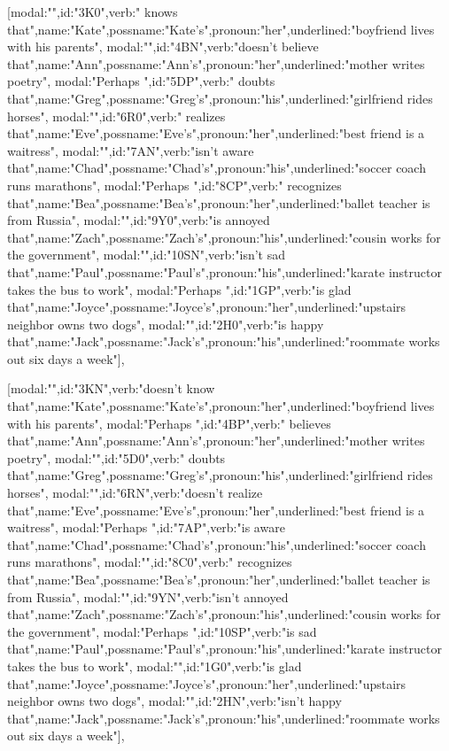 [{modal:"",id:"3K0",verb:" knows that",name:"Kate",possname:"Kate's",pronoun:"her",underlined:"boyfriend lives with his parents"},
{modal:"",id:"4BN",verb:"doesn't believe that",name:"Ann",possname:"Ann's",pronoun:"her",underlined:"mother writes poetry"},
{modal:"Perhaps ",id:"5DP",verb:" doubts that",name:"Greg",possname:"Greg's",pronoun:"his",underlined:"girlfriend rides horses"},
{modal:"",id:"6R0",verb:" realizes that",name:"Eve",possname:"Eve's",pronoun:"her",underlined:"best friend is a waitress"},
{modal:"",id:"7AN",verb:"isn't aware that",name:"Chad",possname:"Chad's",pronoun:"his",underlined:"soccer coach runs marathons"},
{modal:"Perhaps ",id:"8CP",verb:" recognizes that",name:"Bea",possname:"Bea's",pronoun:"her",underlined:"ballet teacher is from Russia"},
{modal:"",id:"9Y0",verb:"is annoyed that",name:"Zach",possname:"Zach's",pronoun:"his",underlined:"cousin works for the government"},
{modal:"",id:"10SN",verb:"isn't sad that",name:"Paul",possname:"Paul's",pronoun:"his",underlined:"karate instructor takes the bus to work"},
{modal:"Perhaps ",id:"1GP",verb:"is glad that",name:"Joyce",possname:"Joyce's",pronoun:"her",underlined:"upstairs neighbor owns two dogs"},
{modal:"",id:"2H0",verb:"is happy that",name:"Jack",possname:"Jack's",pronoun:"his",underlined:"roommate works out six days a week"}],

[{modal:"",id:"3KN",verb:"doesn't know that",name:"Kate",possname:"Kate's",pronoun:"her",underlined:"boyfriend lives with his parents"},
{modal:"Perhaps ",id:"4BP",verb:" believes that",name:"Ann",possname:"Ann's",pronoun:"her",underlined:"mother writes poetry"},
{modal:"",id:"5D0",verb:" doubts that",name:"Greg",possname:"Greg's",pronoun:"his",underlined:"girlfriend rides horses"},
{modal:"",id:"6RN",verb:"doesn't realize that",name:"Eve",possname:"Eve's",pronoun:"her",underlined:"best friend is a waitress"},
{modal:"Perhaps ",id:"7AP",verb:"is aware that",name:"Chad",possname:"Chad's",pronoun:"his",underlined:"soccer coach runs marathons"},
{modal:"",id:"8C0",verb:" recognizes that",name:"Bea",possname:"Bea's",pronoun:"her",underlined:"ballet teacher is from Russia"},
{modal:"",id:"9YN",verb:"isn't annoyed that",name:"Zach",possname:"Zach's",pronoun:"his",underlined:"cousin works for the government"},
{modal:"Perhaps ",id:"10SP",verb:"is sad that",name:"Paul",possname:"Paul's",pronoun:"his",underlined:"karate instructor takes the bus to work"},
{modal:"",id:"1G0",verb:"is glad that",name:"Joyce",possname:"Joyce's",pronoun:"her",underlined:"upstairs neighbor owns two dogs"},
{modal:"",id:"2HN",verb:"isn't happy that",name:"Jack",possname:"Jack's",pronoun:"his",underlined:"roommate works out six days a week"}],

